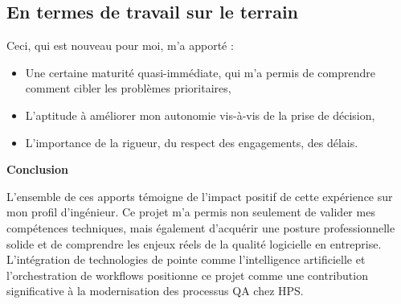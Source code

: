 \subsection{En termes de travail sur le terrain}

Ceci, qui est nouveau pour moi, m'a apporté :
\begin{itemize}[leftmargin=*]
\item Une certaine maturité quasi-immédiate, qui m'a permis de comprendre comment cibler les problèmes prioritaires,
\item L'aptitude à améliorer mon autonomie vis-à-vis de la prise de décision,
\item L'importance de la rigueur, du respect des engagements, des délais.
\end{itemize}

\vspace{10pt}
\textbf{Conclusion}

L'ensemble de ces apports témoigne de l'impact positif de cette expérience sur mon profil d'ingénieur. Ce projet m'a permis non seulement de valider mes compétences techniques, mais également d'acquérir une posture professionnelle solide et de comprendre les enjeux réels de la qualité logicielle en entreprise. L'intégration de technologies de pointe comme l'intelligence artificielle et l'orchestration de workflows positionne ce projet comme une contribution significative à la modernisation des processus QA chez HPS.
